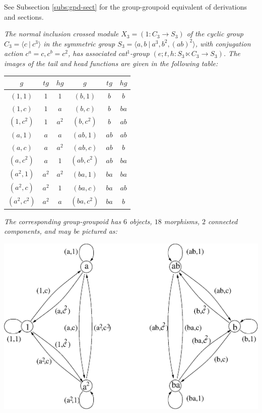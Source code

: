\bigskip\noindent
See Subsection \ref{subs:gpd-sect} for the group-groupoid 
equivalent of derivations and sections.


\bigskip
\begin{example}
\emph{The normal inclusion crossed module $X_3 = (1 : C_3 \to S_3)$ 
of the cyclic group $C_3 = \langle c ~|~ c^3 \rangle$ 
in the symmetric group $S_3 = \langle a,b ~|~ a^3, b^2, (ab)^2 \rangle$,
with conjugation action $c^a=c, c^b=c^2$,
has associated cat$^1$-group $(e;t,h : S_3 \ltimes C_3 \to S_3)$.
The images of the tail and head functions are given in the following table:}
\begin{center}
\begin{tabular}{|ccc|ccc|}
\hline
$g$ & $tg$ & $hg$ & $g$ & $tg$ & $hg$ \\
\hline
$(1,1)$ & $1$ & $1$ &        $(b,1)$ & $b$ & $b$ \\
$(1,c)$ & $1$ & $a$ &        $(b,c)$ & $b$ & $ba$ \\
$(1,c^2)$ & $1$ & $a^2$ &    $(b,c^2)$ & $b$ & $ab$ \\
$(a,1)$ & $a$ & $a$ &        $(ab,1)$ & $ab$ & $ab$ \\
$(a,c)$ & $a$ & $a^2$ &      $(ab,c)$ & $ab$ & $b$ \\
$(a,c^2)$ & $a$ & $1$ &      $(ab,c^2)$ & $ab$ & $ba$ \\
$(a^2,1)$ & $a^2$ & $a^2$ &  $(ba,1)$ & $ba$ & $ba$ \\
$(a^2,c)$ & $a^2$ & $1$ &    $(ba,c)$ & $ba$ & $ab$ \\
$(a^2,c^2)$ & $a^2$ & $a$ &  $(ba,c^2)$ & $ba$ & $b$ \\
\hline
\end{tabular}
\end{center}
\emph{The corresponding group-groupoid has $6$ objects, $18$ morphisms, 
$2$ connected components, and may be pictured as:}
\begin{center}
\includegraphics[scale = 0.60]{xmodcat1/s3ggpd.eps}
\end{center}


\end{example}
